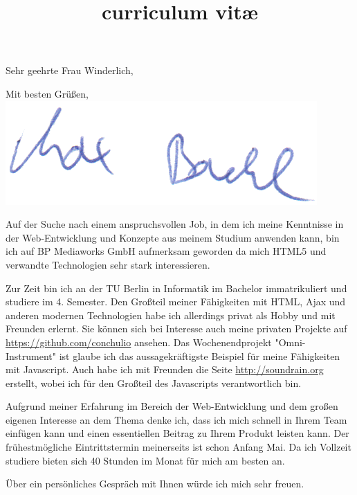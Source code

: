 \documentclass[11pt,a4paper]{moderncv}   %
\title{curriculum vitæ}					%
\newcommand{\employer}{BP Mediaworks GmbH}
\begin{document}
\recipient{\employer{}}{}
\opening{Sehr geehrte Frau Winderlich,}
\closing{Mit besten Grüßen,\\
\vspace*{0.4cm}
\includegraphics{unterschrift.png}
\vspace*{-1.3cm}}
\makelettertitle

Auf der Suche nach einem anspruchsvollen Job, in dem ich meine Kenntnisse in der Web-Entwicklung und Konzepte aus meinem Studium anwenden kann, bin ich auf \employer{} aufmerksam geworden da mich HTML5 und verwandte Technologien sehr stark interessieren.

Zur Zeit bin ich an der TU Berlin in Informatik im Bachelor immatrikuliert und studiere im 4. Semester. Den Großteil meiner Fähigkeiten mit HTML, Ajax und anderen modernen Technologien habe ich allerdings privat als Hobby und mit Freunden erlernt. Sie können sich bei Interesse auch meine privaten Projekte auf \url{https://github.com/conchulio} ansehen. Das Wochenendprojekt "Omni-Instrument" ist glaube ich das aussagekräftigste Beispiel für meine Fähigkeiten mit Javascript. Auch habe ich mit Freunden die Seite \url{http://soundrain.org} erstellt, wobei ich für den Großteil des Javascripts verantwortlich bin.

Aufgrund meiner Erfahrung im Bereich der Web-Entwicklung und dem großen eigenen Interesse an dem Thema denke ich, dass ich mich schnell in Ihrem Team einfügen kann und einen essentiellen Beitrag zu Ihrem Produkt leisten kann. Der frühestmögliche Eintrittstermin meinerseits ist schon Anfang Mai. Da ich Vollzeit studiere bieten sich 40 Stunden im Monat für mich am besten an.

Über ein persönliches Gespräch mit Ihnen würde ich mich sehr freuen.

\makeletterclosing

\clearpage
\makecvtitle
\end{document}
